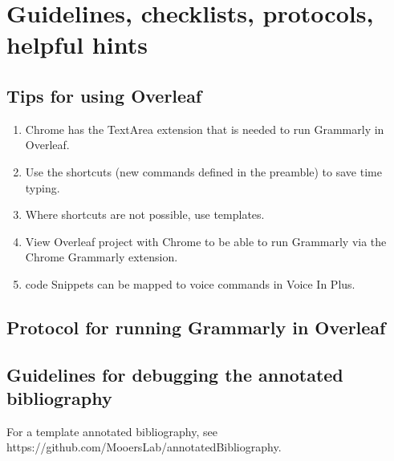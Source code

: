 \documentclass[10pt,letterpaper]{article}
\newcommand{\be}{\begin{enumerate}}
\newcommand{\ee}{\end{enumerate}}
\begin{document}
\section{Guidelines, checklists, protocols, helpful hints}
\label{sec:guides}

\subsection{Tips for using Overleaf}
\label{subsec:guides:overleaf}


\be
\item Chrome has the TextArea extension that is needed to run Grammarly in Overleaf.
\item Use the shortcuts (new commands defined in the preamble) to save time typing.
\item Where shortcuts are not possible, use templates.
\item View Overleaf project with Chrome to be able to run Grammarly via the Chrome Grammarly extension.
\item code Snippets can be mapped to voice commands in Voice In Plus.
\ee 


\subsection{Protocol for running Grammarly in Overleaf}
\label{subsec:guides:grammarlyInoverleaf}



\subsection{Guidelines for debugging the annotated bibliography} 
\label{subsec:guides:annotDebug}

For a template annotated bibliography, see https://github.com/MooersLab/annotatedBibliography.
\end{document}

